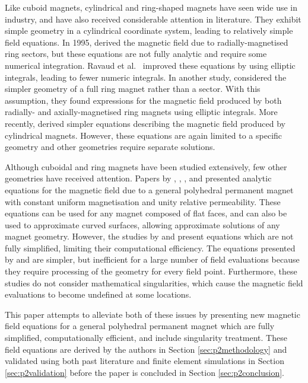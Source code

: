 Like cuboid magnets, cylindrical and ring-shaped magnets have seen wide use in industry, and have also received considerable attention in literature. They exhibit simple geometry in a cylindrical coordinate system, leading to relatively simple field equations. In 1995, \textcite{Furlani1995} derived the magnetic field due to radially-magnetised ring sectors, but these equations are not fully analytic and require some numerical integration. Ravaud et al.\ \cite{Ravaud2008a,Ravaud2010} improved these equations by using elliptic integrals, leading to fewer numeric integrals. In another study, \textcite{Ravaud2008} considered the simpler geometry of a full ring magnet rather than a sector. With this assumption, they found expressions for the magnetic field produced by both radially- and axially-magnetised ring magnets using elliptic integrals. More recently, \textcite{Caciagli2018} derived simpler equations describing the magnetic field produced by cylindrical magnets. However, these equations are again limited to a specific geometry and other geometries require separate solutions.

Although cuboidal and ring magnets have been studied extensively, few other geometries have received attention. Papers by \textcite{Janssen2009,Janssen2010a}, \textcite{Compter2010}, \textcite{Rubeck2013}, and \textcite{OConnell2020} presented analytic equations for the magnetic field due to a general polyhedral permanent magnet with constant uniform magnetisation and unity relative permeability. These equations can be used for any magnet composed of flat faces, and can also be used to approximate curved surfaces, allowing approximate solutions of any magnet geometry. However, the studies by \textcite{Janssen2009,Janssen2010a} and \textcite{Compter2010} present equations which are not fully simplified, limiting their computational efficiency. The equations presented by \textcite{Rubeck2013} and \textcite{OConnell2020} are simpler, but inefficient for a large number of field evaluations because they require processing of the geometry for every field point. Furthermore, these studies do not consider mathematical singularities, which cause the magnetic field evaluations to become undefined at some locations.

This paper attempts to alleviate both of these issues by presenting new magnetic field equations for a general polyhedral permanent magnet which are fully simplified, computationally efficient, and include singularity treatment. These field equations are derived by the authors in Section \ref{sec:p2methodology} and validated using both past literature and finite element simulations in Section \ref{sec:p2validation} before the paper is concluded in Section \ref{sec:p2conclusion}.